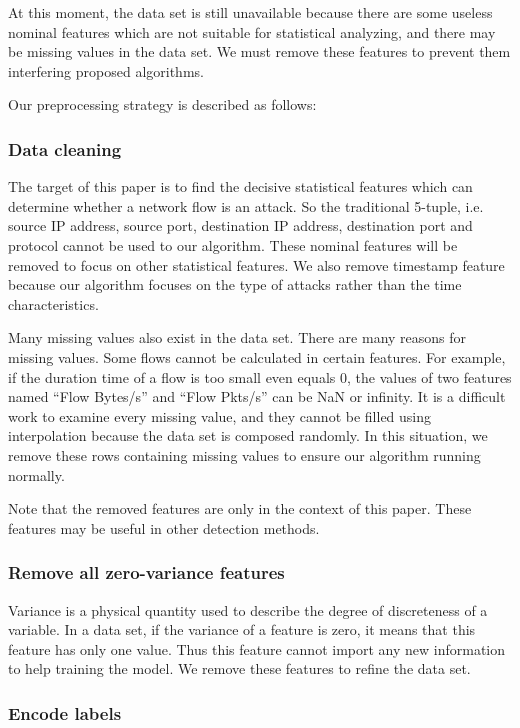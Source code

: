 \documentclass[journal]{IEEEtran}
\begin{document}
At this moment, the data set is still unavailable because there are some useless nominal features which are not suitable for statistical analyzing, and there may be missing values in the data set. We must remove these features to prevent them interfering proposed algorithms.

Our preprocessing strategy is described as follows:

\subsubsection{Data cleaning}
The target of this paper is to find the decisive statistical features which can determine whether a network flow is an attack. 
So the traditional 5-tuple, i.e. source IP address, source port, destination IP address, destination port and protocol cannot be used to our algorithm. 
These nominal features will be removed to focus on other statistical features. 
We also remove timestamp feature because our algorithm focuses on the type of attacks rather than the time characteristics.

Many missing values also exist in the data set. There are many reasons for missing values. Some flows cannot be calculated in certain features. For example, if the duration time of a flow is too small even equals 0, the values of two features named ``Flow Bytes/s'' and ``Flow Pkts/s'' can be NaN or infinity. It is a difficult work to examine every missing value, and they cannot be filled using interpolation because the data set is composed randomly. In this situation, we remove these rows containing missing values to ensure our algorithm running normally.

Note that the removed features are only in the context of this paper. These features may be useful in other detection methods.

\subsubsection{Remove all zero-variance features}

Variance is a physical quantity used to describe the degree of discreteness of a variable. In a data set, if the variance of a feature is zero, it means that this feature has only one value. Thus this feature cannot import any new information to help training the model. We remove these features to refine the data set.

\subsubsection{Encode labels}
\end{document}

